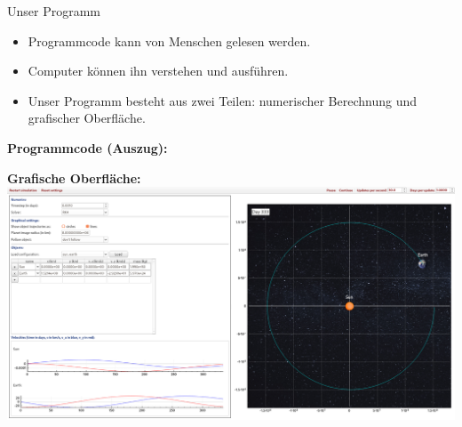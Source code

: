 \documentclass[
  a0paper,
  portrait,
  fontscale=.35 %
  ]{baposterrptu}
\begin{document}
\begin{poster}
  \begin{posterbox}[name=outlook, below=zeitschritt, column=1]{Unser Programm}
    \begin{itemize}
      \item Programmcode kann von Menschen gelesen werden.
      \item Computer können ihn verstehen und ausführen.
      \item Unser Programm besteht aus zwei Teilen: numerischer Berechnung und grafischer Oberfläche.
    \end{itemize}
    \vspace*{.75cm}
                  \textbf{Programmcode (Auszug):}
                    \begin{tcolorbox}
                
                    \end{tcolorbox}
                \vspace*{.75cm}
                \textbf{Grafische Oberfläche:}\\[.3cm]
                \includegraphics[width=\textwidth]{ui.png}
  \end{posterbox}

\end{poster}
\end{document}
